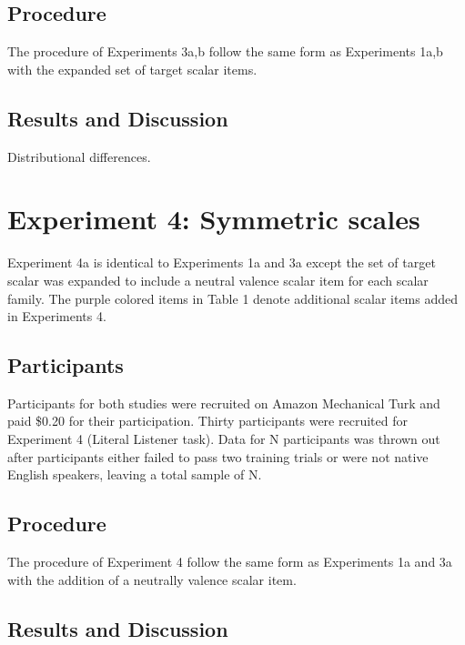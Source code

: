 \documentclass[10pt, letterpaper]{article}
\begin{document}
\subsection{Procedure}\label{procedure}

The procedure of Experiments 3a,b follow the same form as Experiments
1a,b with the expanded set of target scalar items.

\subsection{Results and Discussion}\label{results-and-discussion-2}

Distributional differences.

\section{Experiment 4: Symmetric
scales}\label{experiment-4-symmetric-scales}

Experiment 4a is identical to Experiments 1a and 3a except the set of
target scalar was expanded to include a neutral valence scalar item for
each scalar family. The purple colored items in Table 1 denote
additional scalar items added in Experiments 4.

\subsection{Participants}\label{participants-3}

Participants for both studies were recruited on Amazon Mechanical Turk
and paid \$0.20 for their participation. Thirty participants were
recruited for Experiment 4 (Literal Listener task). Data for N
participants was thrown out after participants either failed to pass two
training trials or were not native English speakers, leaving a total
sample of N.

\subsection{Procedure}\label{procedure-1}

The procedure of Experiment 4 follow the same form as Experiments 1a and
3a with the addition of a neutrally valence scalar item.

\subsection{Results and Discussion}\label{results-and-discussion-3}
\end{document}
